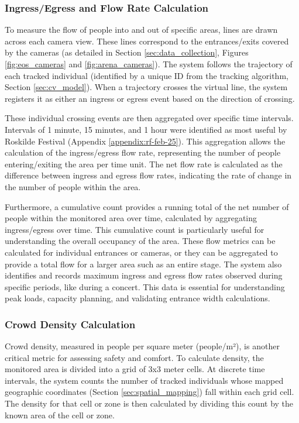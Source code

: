 \subsubsection{Ingress/Egress and Flow Rate Calculation}

To measure the flow of people into and out of specific areas, lines are drawn across each camera view. These lines correspond to the entrances/exits covered by the cameras (as detailed in Section \ref{sec:data_collection}, Figures \ref{fig:eos_cameras} and \ref{fig:arena_cameras}). The system follows the trajectory of each tracked individual (identified by a unique ID from the tracking algorithm, Section \ref{sec:cv_model}). When a trajectory crosses the virtual line, the system registers it as either an ingress or egress event based on the direction of crossing.

These individual crossing events are then aggregated over specific time intervals. Intervals of 1 minute, 15 minutes, and 1 hour were identified as most useful by Roskilde Festival (Appendix \ref{appendix:rf-feb-25}). This aggregation allows the calculation of the ingress/egress flow rate, representing the number of people entering/exiting the area per time unit. The net flow rate is calculated as the difference between ingress and egress flow rates, indicating the rate of change in the number of people within the area.

Furthermore, a cumulative count provides a running total of the net number of people within the monitored area over time, calculated by aggregating ingress/egress over time. This cumulative count is particularly useful for understanding the overall occupancy of the area. These flow metrics can be calculated for individual entrances or cameras, or they can be aggregated to provide a total flow for a larger area such as an entire stage. The system also identifies and records maximum ingress and egress flow rates observed during specific periods, like during a concert. This data is essential for understanding peak loads, capacity planning, and validating entrance width calculations.

\subsubsection{Crowd Density Calculation}
Crowd density, measured in people per square meter (people/m²), is another critical metric for assessing safety and comfort. To calculate density, the monitored area is divided into a grid of 3x3 meter cells. At discrete time intervals, the system counts the number of tracked individuals whose mapped geographic coordinates (Section \ref{sec:spatial_mapping}) fall within each grid cell. The density for that cell or zone is then calculated by dividing this count by the known area of the cell or zone.

